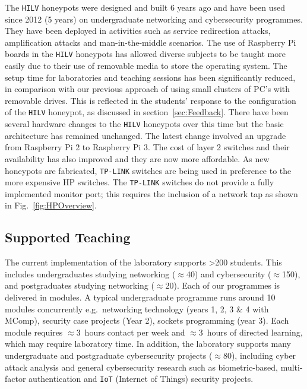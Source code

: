 \documentclass{ieeeaccess}
\begin{document}
The \texttt{HILV} honeypots were designed and built 6 years ago and have been
used since 2012 (5 years) on undergraduate networking and cybersecurity
programmes. They have been deployed in activities such as service redirection
attacks, amplification attacks and man-in-the-middle scenarios.  The use of
Raspberry Pi boards in the \texttt{HILV} honeypots has allowed diverse subjects
to be taught more easily due to their use of removable media to store the
operating system. The setup time for laboratories and teaching sessions has
been significantly reduced, in comparison with our previous approach of using
small clusters of PC's with removable drives. This is reflected in the
students' response to the configuration of the \texttt{HILV} honeypot, as
discussed in section~\ref{sec:Feedback}.  There have been several hardware
changes to the \texttt{HILV} honeypots over this time but the basic
architecture has remained unchanged. The latest change involved an upgrade from
Raspberry Pi 2 to Raspberry Pi 3. The cost of layer 2 switches and their
availability has also improved and they are now more affordable. As new
honeypots are fabricated, \texttt{TP-LINK} switches are being used in
preference to the more expensive HP switches. The \texttt{TP-LINK} switches do
not provide a fully implemented monitor port; this requires the inclusion of a
network tap as shown in Fig.~\ref{fig:HPOverview}.

\subsection{Supported Teaching\label{ResourceSupport}}

The current implementation of the laboratory supports \textgreater200 students. This
includes undergraduates studying networking ($\approx$40) and cybersecurity
($\approx$150), and postgraduates studying networking ($\approx$20). Each of our
programmes is delivered in modules. A typical undergraduate programme runs
around 10 modules concurrently e.g.\ networking technology (years 1, 2, 3 \&
4 with MComp), security case projects (Year 2), sockets programming (year 3).
Each module requires $\approx$3~hours contact per week and $\approx$3~hours of
directed learning, which may require laboratory time.  In addition, the
laboratory supports many undergraduate and postgraduate cybersecurity projects
($\approx$80), including cyber attack analysis and general cybersecurity research
such as biometric-based, multi-factor authentication and \texttt{IoT} (Internet
of Things) security projects.
\end{document}
